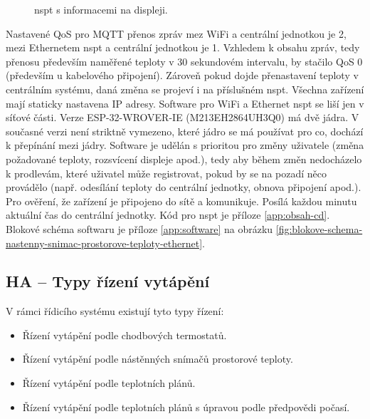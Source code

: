 \begin{figure}[H]
\caption{\acrshort{nspt} s informacemi na displeji.}
\label{fig:software-nastenny-snimac-prostorove-teploty-zapnuty-displej}
\end{figure}

Nastavené QoS pro MQTT přenos zpráv mez WiFi a centrální jednotkou je 2, mezi Ethernetem \acrshort{nspt} a centrální jednotkou je 1. Vzhledem k obsahu zpráv, tedy přenosu především naměřené teploty v 30 sekundovém intervalu, by stačilo QoS 0 (především u kabelového připojení). Zároveň pokud dojde přenastavení teploty v centrálním systému, daná změna se projeví i na příslušném \acrshort{nspt}. Všechna zařízení mají staticky nastavena IP adresy. Software pro WiFi a Ethernet \acrshort{nspt} se liší jen v síťové části. Verze ESP-32-WROVER-IE (M213EH2864UH3Q0) má dvě jádra. V současné verzi není striktně vymezeno, které jádro se má používat pro co, dochází k přepínání mezi jádry. Software je udělán s prioritou pro změny uživatele (změna požadované teploty, rozsvícení displeje apod.), tedy aby během změn nedocházelo k prodlevám, které uživatel může registrovat, pokud by se na pozadí něco provádělo (např. odesílání teploty do centrální jednotky, obnova připojení apod.). Pro ověření, že zařízení je připojeno do sítě a komunikuje. Posílá každou minutu aktuální čas do centrální jednotky. Kód pro \acrshort{nspt} je příloze \ref{app:obsah-cd}. Blokové schéma softwaru je příloze \ref{app:software} na obrázku \ref{fig:blokove-schema-nastenny-snimac-prostorove-teploty-ethernet}.


\newpage

\subsection{HA – Typy řízení vytápění}

\label{sec:typy-rizeni-vytapeni}
V rámci řídicího systému existují tyto typy řízení:

\begin{itemize}
  \item Řízení vytápění podle chodbových termostatů.
  \item Řízení vytápění podle nástěnných snímačů prostorové teploty.
  \item Řízení vytápění podle teplotních plánů.
  \item Řízení vytápění podle teplotních plánů s úpravou podle předpovědi počasí.
\end{itemize}

